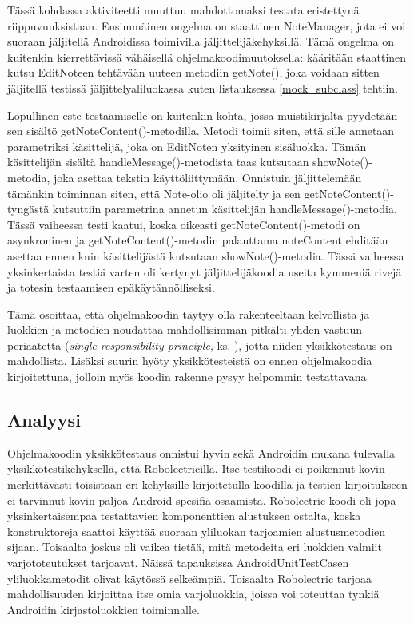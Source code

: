 Tässä kohdassa aktiviteetti muuttuu mahdottomaksi testata eristettynä riippuvuuksistaan. Ensimmäinen ongelma on staattinen NoteManager, jota ei voi suoraan jäljitellä Androidissa toimivilla jäljittelijäkehyksillä. Tämä ongelma on kuitenkin kierrettävissä vähäisellä ohjelmakoodimuutoksella: kääritään staattinen kutsu EditNoteen tehtävään uuteen metodiin getNote(), joka voidaan sitten jäljitellä testissä jäljittelyaliluokassa kuten listauksessa \ref{mock_subclass} tehtiin.

Lopullinen este testaamiselle on kuitenkin kohta, jossa muistikirjalta pyydetään sen sisältö getNoteContent()-metodilla. Metodi toimii siten, että sille annetaan parametriksi käsittelijä, joka on EditNoten yksityinen sisäluokka. Tämän käsittelijän sisältä handleMessage()-metodista taas kutsutaan showNote()-metodia, joka asettaa tekstin käyttöliittymään. Onnistuin jäljittelemään tämänkin toiminnan siten, että Note-olio oli jäljitelty ja sen getNoteContent()-tyngästä kutsuttiin parametrina annetun käsittelijän handleMessage()-metodia. Tässä vaiheessa testi kaatui, koska oikeasti getNoteContent()-metodi on asynkroninen ja getNoteContent()-metodin palauttama noteContent ehditään asettaa ennen kuin käsittelijästä kutsutaan showNote()-metodia. Tässä vaiheessa yksinkertaista testiä varten oli kertynyt jäljittelijäkoodia useita kymmeniä rivejä ja totesin testaamisen epäkäytännölliseksi.

Tämä osoittaa, että ohjelmakoodin täytyy olla rakenteeltaan kelvollista ja luokkien ja metodien noudattaa mahdollisimman pitkälti yhden vastuun periaatetta (\emph{single responsibility principle}, ks. \cite[95-98]{agile_development}), jotta niiden yksikkötestaus on mahdollista. Lisäksi suurin hyöty yksikkötesteistä on ennen ohjelmakoodia kirjoitettuna, jolloin myös koodin rakenne pysyy helpommin testattavana.

\subsection{Analyysi}

Ohjelmakoodin yksikkötestaus onnistui hyvin sekä Androidin mukana tulevalla yksikkötestikehyksellä, että Robolectricillä. Itse testikoodi ei poikennut kovin merkittävästi toisistaan eri kehyksille kirjoitetulla koodilla ja testien kirjoitukseen ei tarvinnut kovin paljoa Android-spesifiä osaamista. Robolectric-koodi oli jopa yksinkertaisempaa testattavien komponenttien alustuksen ostalta, koska konstruktoreja saattoi käyttää suoraan yliluokan tarjoamien alustusmetodien sijaan. Toisaalta joskus oli vaikea tietää, mitä metodeita eri luokkien valmiit varjototeutukset tarjoavat. Näissä tapauksissa AndroidUnitTestCasen yliluokkametodit olivat käytössä selkeämpiä. Toisaalta Robolectric tarjoaa mahdollisuuden kirjoittaa itse omia varjoluokkia, joissa voi toteuttaa tynkiä Androidin kirjastoluokkien toiminnalle.

